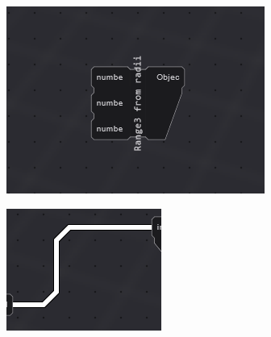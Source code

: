 \begin{figure}
  \centering
  \begin{subfigure}[b]{0.30\linewidth}
    \graphicspath{ {../../assets/images/implementation/} }
    \centering
    \includegraphics[width=\linewidth]{node.png}
    \caption{}\label{fig:node-cable:1}
  \end{subfigure}%
  \qquad 
  \begin{subfigure}[b]{0.30\linewidth}
    \graphicspath{ {../../assets/images/implementation/} }
    \centering
    \includegraphics[width=\linewidth]{cable.png}
    \caption{}\label{fig:node-cable:2}
  \end{subfigure}%
  \qquad 
  \begin{subfigure}[b]{0.30\linewidth}

\end{subfigure}
\end{figure}
